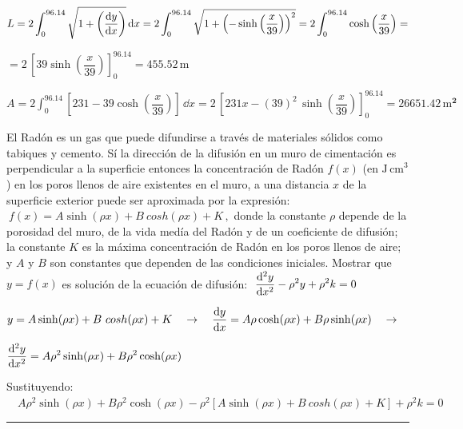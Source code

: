 $L=2\displaystyle \int_0^{96.14} \sqrt{1+\left( \dv{y}{x} \right)} \, \dd x= 2\int_0^{96.14} \sqrt{ 1+ \left( - \sinh \left( \dfrac{x}{39} \right) \right)^2 } =2 \int_0^{96.14} \cosh  \left( \dfrac{x}{39} \right) =$

$= \displaystyle 2\,  \left[ 39 \sinh  \left( \dfrac{x}{39} \right) \right]_0^{96.14}=\boldsymbol{ 455.52 \, \mathrm{m} } $ 

\vspace{3mm}

$A=\displaystyle 2 \int_0^{96.14} \left[ 231-39 \cosh \left( \dfrac{x}{39} \right) \right] \, \dd x = 2 \, \left[ 231 x- (39)^2 \, \sinh \left( \dfrac{x}{39} \right) \right]_0^{96.14}= \boldsymbol{26651.42\, \mathrm{m}^2}$

\vspace{10mm}

\begin{miejercicio}

El Radón es un gas que puede difundirse a través de materiales sólidos como tabiques y cemento. Sí la dirección de la difusión en un muro de cimentación es perpendicular a la superficie entonces la concentración de Radón $f(x)$ (en $\mathrm{J\, cm}^3$) en los poros llenos de aire existentes en el muro, a una distancia $x$ de la superficie exterior puede ser aproximada por la expresión: $\ f(x) = A \sinh (\rho x)+ B \ cosh (\rho x)+ K\, , $ donde la constante $\rho$ depende de la porosidad del muro, de la vida medía del Radón y de un coeficiente de difusión; la constante $K$ es la máxima concentración de Radón en los poros llenos de aire; y $A$ y $B$ son constantes que dependen de las condiciones iniciales. Mostrar que $y=f(x)$ es solución de la ecuación de difusión:	 $\ \displaystyle \dv[2]{y}{x}-\rho^2 y+ \rho^2 k=0$
\end{miejercicio}

\vspace{5mm}

$y= A \sinh (\rho x)+ B \ cosh (\rho x)+ K \quad \to \quad \displaystyle \dv{y}{x}=A\rho \cosh (\rho x)+B\rho \sinh (\rho x) \quad \to \quad $

$\displaystyle \dv[2]{y}{x}=A\rho^2 \sinh (\rho x)+B\rho^2 \cosh (\rho x)$

Sustituyendo: $\quad A\rho^2 \sinh (\rho x)+B\rho^2 \cosh (\rho x)-\rho^2 \left[  A \sinh (\rho x)+ B \ cosh (\rho x)+ K  \right] +\rho^2 k =0$




\vspace{10mm}
\newpage %
\color{gris}
\rule{250pt}{0.1pt}

